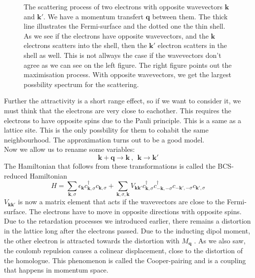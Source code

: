 \documentclass[../main.tex]{subfile}
\begin{document}
\begin{figure}[H]
    \caption{The scattering process of two electrons with opposite wavevectors $\bm{k}$ and $\bm{k}'$. We have a momentum transfert $\bm{q}$ between them. 
    The thick line illustrates the Fermi-surface and the dotted one the thin shell. As we see if the electrons have opposite wavevectors, and the $\bm{k}$ electrons
    scatters into the shell, then the $\bm{k}'$ electron scatters in the shell as well. This is not allways the case if the wavevectors don't agree as we can see on the left figure.
    The right figure points out the maximisation process. With opposite wavevectors,
    we get the largest possbility spectrum for the scattering.}
\end{figure}
Further the attractivity is a short range effect, so if we want to consider it, we must think that the electrons are very close to eachother.
This requires the electrons to have opposite spins due to the Pauli principle. This is a same as a lattice site. This is the only 
possbility for them to cohabit the same neighbourhood.  The approximation turns out to be a good model.\\

Now we allow us to rename some variables:
\[
    \bm{k} + \bm{q} \longrightarrow \bm{k} ~,~~ \bm{k} \longrightarrow \bm{k}'
\]
The Hamiltonian that follows from these transformations is called the BCS-reduced Hamiltonian
\begin{equation} \label{eq:BCS_ReducedHamiltonian}
    H = \sum_{\bm{k},\sigma} \epsilon_{\bm{k}} c_{\bm{k},\sigma}^{\dagger}c_{\bm{k},\sigma} + \sum_{\bm{k},\sigma,\bm{k}} V_{\bm{k}\bm{k}'} c_{\bm{k},\sigma}^{\dagger}c_{-\bm{k},-\sigma}^{\dagger}c_{-\bm{k}',-\sigma}c_{\bm{k}',\sigma}
\end{equation}
$V_{\bm{k}\bm{k}'}$ is now a matrix element that acts if the wavevectors are close to the Fermi-surface. The electrons have to move in opposite directions with opposite spins.
Due to the retardation processes we introduced earlier, there remains a distortion in the lattice long after the electrons passed. Due to the inducting dipol moment,
the other electron is attracted towards the distortion with $M_{\bm{q}}$ . As we also saw, the coulomb repulsion causes a colinear displacement, close to the distortion
of the homologue. This phenomenon is called the Cooper-pairing and is a coupling that happens in momentum space.\\
\end{document}
